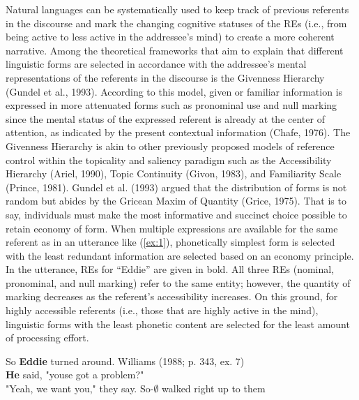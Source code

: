 \documentclass[]{elsarticle} %
\begin{document}
Natural languages can be systematically used to keep track of previous
referents in the discourse and mark the changing cognitive statuses of
the REs (i.e., from being active to less active in the addressee's mind)
to create a more coherent narrative. Among the theoretical frameworks
that aim to explain that different linguistic forms are selected in
accordance with the addressee's mental representations of the referents
in the discourse is the Givenness Hierarchy (Gundel et al., 1993).
According to this model, given or familiar information is expressed in
more attenuated forms such as pronominal use and null marking since the
mental status of the expressed referent is already at the center of
attention, as indicated by the present contextual information (Chafe,
1976). The Givenness Hierarchy is akin to other previously proposed
models of reference control within the topicality and saliency paradigm
such as the Accessibility Hierarchy (Ariel, 1990), Topic Continuity
(Givon, 1983), and Familiarity Scale (Prince, 1981). Gundel et al.
(1993) argued that the distribution of forms is not random but abides by
the Gricean Maxim of Quantity (Grice, 1975). That is to say, individuals
must make the most informative and succinct choice possible to retain
economy of form. When multiple expressions are available for the same
referent as in an utterance like (\ref{ex:1}), phonetically simplest
form is selected with the least redundant information are selected based
on an economy principle. In the utterance, REs for ``Eddie'' are given
in bold. All three REs (nominal, pronominal, and null marking) refer to
the same entity; however, the quantity of marking decreases as the
referent's accessibility increases. On this ground, for highly
accessible referents (i.e., those that are highly active in the mind),
linguistic forms with the least phonetic content are selected for the
least amount of processing effort.

\begin{exe}
    \ex \label{ex:1}
    So \textbf{Eddie} turned around. \hfill Williams (1988; p. 343, ex. 7) \\
\textbf{He} said, "youse got a problem?" \\
"Yeah, we want you," they say.
So-$\pmb{\emptyset}$ walked right up to them \\
\end{exe}
\end{document}
